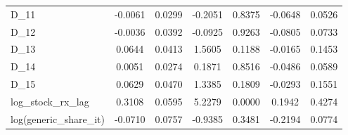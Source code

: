 \documentclass[a4paper,11pt,uplatex]{jsarticle}
\theoremstyle{definition}
\begin{document}
\begin{appendices}
\begin{table}[ht]
\begin{tabular}{lcccccc}
        D\_11 & -0.0061 & 0.0299 & -0.2051 & 0.8375 & -0.0648 & 0.0526 \\
        D\_12 & -0.0036 & 0.0392 & -0.0925 & 0.9263 & -0.0805 & 0.0733 \\
        D\_13 & 0.0644 & 0.0413 & 1.5605 & 0.1188 & -0.0165 & 0.1453 \\
        D\_14 & 0.0051 & 0.0274 & 0.1871 & 0.8516 & -0.0486 & 0.0589 \\
        D\_15 & 0.0629 & 0.0470 & 1.3385 & 0.1809 & -0.0293 & 0.1551 \\
        log\_stock\_rx\_lag & 0.3108 & 0.0595 & 5.2279 & 0.0000 & 0.1942 & 0.4274 \\
        log(generic\_share\_it) & -0.0710 & 0.0757 & -0.9385 & 0.3481 & -0.2194 & 0.0774 \\
        \hline
        \end{tabular}
    \end{table}
     

\end{appendices}
\end{document}
